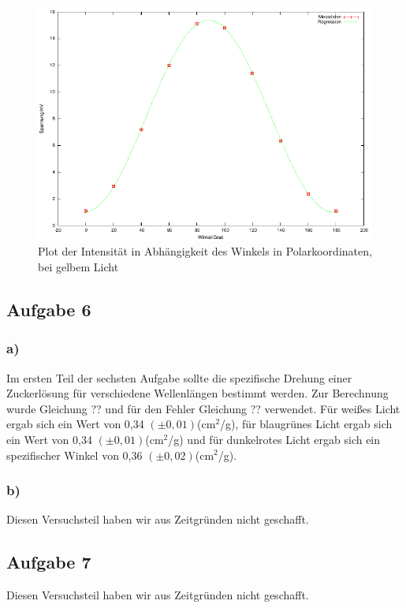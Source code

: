 \documentclass[12pt]{scrartcl}
\begin{document}
\begin{figure}[H]
\centering
    \includegraphics[scale = 1]{a_5_d.pdf}
  	\caption[Plot der Intensität in Abhängigkeit des Winkels in Polarkoordinaten, bei gelbem Licht]{Plot der Intensität in Abhängigkeit des Winkels in Polarkoordinaten, bei gelbem Licht}
  \label{fig:a_5_d}
\end{figure}


\subsection{Aufgabe 6}

\subsubsection{a)}
Im ersten Teil der sechsten Aufgabe sollte die spezifische Drehung einer Zuckerlösung für verschiedene Wellenlängen bestimmt werden. Zur Berechnung wurde Gleichung ?? und für den Fehler Gleichung ?? verwendet. Für weißes Licht ergab sich ein Wert von 0,34 $(\pm 0,01)$(cm$^2$/g), für blaugrünes Licht ergab sich ein Wert von 0,34 $(\pm 0,01)$(cm$^2$/g) und für dunkelrotes Licht ergab sich ein spezifischer Winkel von 0,36 $(\pm 0,02)$(cm$^2$/g).

\subsubsection{b)}
Diesen Versuchsteil haben wir aus Zeitgründen nicht geschafft.

\subsection{Aufgabe 7}
Diesen Versuchsteil haben wir aus Zeitgründen nicht geschafft.
\end{document}
